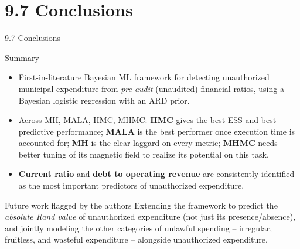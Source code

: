 \documentclass[aspectratio=169,10pt]{beamer}
\begin{document}
\section{9.7 Conclusions}

\begin{frame}{9.7 Conclusions}

\begin{block}{Summary}
\begin{itemize}
  \item First-in-literature Bayesian ML framework for detecting
  unauthorized municipal expenditure from \emph{pre-audit} (unaudited)
  financial ratios, using a Bayesian logistic regression with an ARD prior.
  \item Across MH, MALA, HMC, MHMC: \textbf{HMC} gives the best ESS and
  best predictive performance; \textbf{MALA} is the best performer once
  execution time is accounted for; \textbf{MH} is the clear laggard on
  every metric; \textbf{MHMC} needs better tuning of its magnetic field to
  realize its potential on this task.
  \item \textbf{Current ratio} and \textbf{debt to operating revenue} are
  consistently identified as the most important predictors of unauthorized
  expenditure.
\end{itemize}
\end{block}

\begin{block}{Future work flagged by the authors}
Extending the framework to predict the \emph{absolute Rand value} of
unauthorized expenditure (not just its presence/absence), and jointly
modeling the other categories of unlawful spending -- irregular, fruitless,
and wasteful expenditure -- alongside unauthorized expenditure.
\end{block}

\end{frame}
\end{document}
